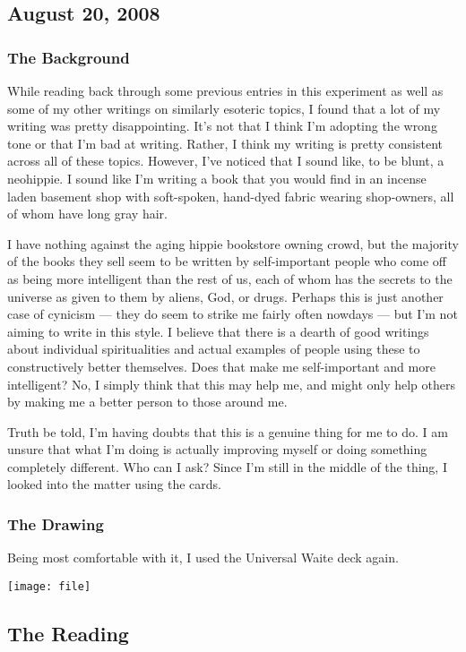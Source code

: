 \subsection{August 20, 2008}
\subsubsection*{The Background}
While reading back through some previous entries in this experiment as
well as some of my other writings on similarly esoteric topics, I found
that a lot of my writing was pretty disappointing.  It's not that I
think I'm adopting the wrong tone or that I'm bad at writing.  Rather, I
think my writing is pretty consistent across all of these topics.
However, I've noticed that I sound like, to be blunt, a neohippie.  I
sound like I'm writing a book that you would find in an incense laden
basement shop with soft-spoken, hand-dyed fabric wearing shop-owners,
all of whom have long gray hair.

I have nothing against the aging hippie bookstore owning crowd, but the
majority of the books they sell seem to be written by self-important
people who come off as being more intelligent than the rest of us, each
of whom has the secrets to the universe as given to them by aliens, God,
or drugs.  Perhaps this is just another case of cynicism --- they do
seem to strike me fairly often nowdays --- but I'm not aiming to write
in this style.  I believe that there is a dearth of good writings about
individual spiritualities and actual examples of people using these to
constructively better themselves.  Does that make me self-important and
more intelligent?  No, I simply think that this may help me, and might
only help others by making me a better person to those around me.

Truth be told, I'm having doubts that this is a genuine thing for me to
do.  I am unsure that what I'm doing is actually improving myself or
doing something completely different.  Who can I ask?  Since I'm still 
in the middle of the thing, I looked into the matter using the cards.

\subsubsection*{The Drawing}
Being most comfortable with it, I used the Universal
Waite\cite{tarotRWS} deck again.

\begin{itemize}
\end{itemize}
\texttt{[image: file]}

\subsection*{The Reading}
